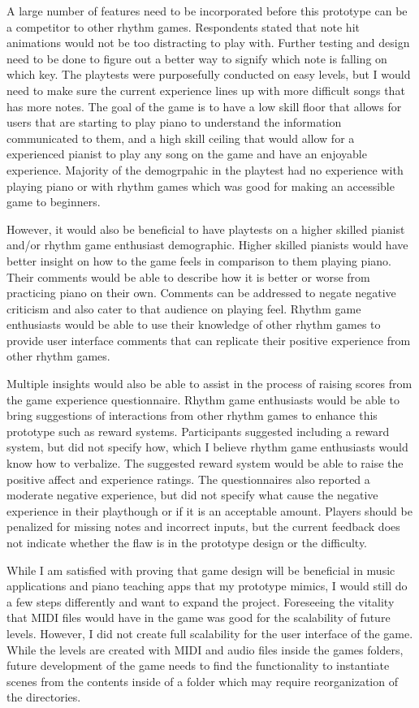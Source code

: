 \documentclass[10pt,twocolumn]{article}
\begin{document}
A large number of features need to be incorporated before this prototype can be a competitor to other rhythm games. Respondents stated that note hit animations would not be too distracting to play with. Further testing and design need to be done to figure out a better way to signify which note is falling on which key. The playtests were purposefully conducted on easy levels, but I would need to make sure the current experience lines up with more difficult songs that has more notes. The goal of the game is to have a low skill floor that allows for users that are starting to play piano to understand the information communicated to them, and a high skill ceiling that would allow for a experienced pianist to play any song on the game and have an enjoyable experience. Majority of the demogrpahic in the playtest had no experience with playing piano or with rhythm games which was good for making an accessible game to beginners. 

However, it would also be beneficial to have playtests on a higher skilled pianist and/or rhythm game enthusiast demographic. Higher skilled pianists would have better insight on how to the game feels in comparison to them playing piano. Their comments would be able to describe how it is better or worse from practicing piano on their own. Comments can be addressed to negate negative criticism and also cater to that audience on playing feel. Rhythm game enthusiasts would be able to use their knowledge of other rhythm games to provide user interface comments that can replicate their positive experience from other rhythm games. 

Multiple insights would also be able to assist in the process of raising scores from the game experience questionnaire. Rhythm game enthusiasts would be able to bring suggestions of interactions from other rhythm games to enhance this prototype such as reward systems. Participants suggested including a reward system, but did not specify how, which I believe rhythm game enthusiasts would know how to verbalize. The suggested reward system would be able to raise the positive affect and experience ratings. The questionnaires also reported a moderate negative experience, but did not specify what cause the negative experience in their playthough or if it is an acceptable amount. Players should be penalized for missing notes and incorrect inputs, but the current feedback does not indicate whether the flaw is in the prototype design or the difficulty. 

While I am satisfied with proving that game design will be beneficial in music applications and piano teaching apps that my prototype mimics, I would still do a few steps differently and want to expand the project. Foreseeing the vitality that MIDI files would have in the game was good for the scalability of future levels. However, I did not create full scalability for the user interface of the game. While the levels are created with MIDI and audio files inside the games folders, future development of the game needs to find the functionality to instantiate scenes from the contents inside of a folder which may require reorganization of the directories. 
\end{document}
